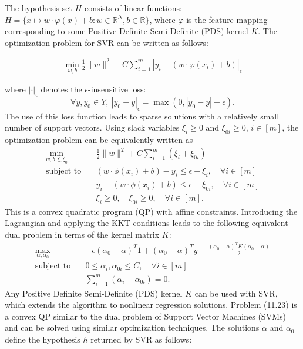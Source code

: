 \documentclass[fleqn,10pt]{olplainarticle}
\begin{document}
The hypothesis set $H$ consists of linear functions: $H = \{x \mapsto w \cdot \varphi(x) + b: w \in \mathbb{R}^N, b \in \mathbb{R}\}$, where $\varphi$ is the feature mapping corresponding to some Positive Definite Semi-Definite (PDS) kernel $K$. The optimization problem for SVR can be written as follows:

\begin{align}
\min_{w, b} \frac{1}{2}\|w\|^2 + C \sum_{i=1}^m \left|y_i - \left(w \cdot \varphi(x_i) + b\right)\right|_\epsilon \label{eq:svr}
\end{align}

where $|\cdot|_\epsilon$ denotes the $\epsilon$-insensitive loss:
\[
\forall y,y_0 \in Y, \ |y_0 - y|_\epsilon = \max(0, |y_0 - y| - \epsilon).
\]
The use of this loss function leads to sparse solutions with a relatively small number of support vectors. Using slack variables $\xi_i \geq 0$ and $\xi_{0i} \geq 0$, $i \in [m]$, the optimization problem can be equivalently written as
\[
\begin{aligned}
    \min_{w,b,\xi,\xi_0} \quad & \frac{1}{2} \|w\|^2 + C \sum_{i=1}^{m} (\xi_i + \xi_{0i}) \\
    \text{subject to} \quad & (w \cdot \phi(x_i) + b) - y_i \leq \epsilon + \xi_i, \quad \forall i \in [m] \\
    & y_i - (w \cdot \phi(x_i) + b) \leq \epsilon + \xi_{0i}, \quad \forall i \in [m] \\
    & \xi_i \geq 0, \quad \xi_{0i} \geq 0, \quad \forall i \in [m].
\end{aligned}
\]
This is a convex quadratic program (QP) with affine constraints. Introducing the Lagrangian and applying the KKT conditions leads to the following equivalent dual problem in terms of the kernel matrix $K$:
\[
\begin{aligned}
    \max_{\alpha,\alpha_0} \quad & -\epsilon (\alpha_0 - \alpha)^T1 +(\alpha_0 - \alpha)^Ty - \frac{(\alpha_0 - \alpha)^TK(\alpha_0 - \alpha)}{2} \\
    \text{subject to} \quad & 0 \leq \alpha_i, \alpha_{0i} \leq C, \quad \forall i \in [m] \\
    & \sum_{i=1}^{m} (\alpha_i - \alpha_{0i}) = 0.
\end{aligned}
\]
Any Positive Definite Semi-Definite (PDS) kernel $K$ can be used with SVR, which extends the algorithm to nonlinear regression solutions. Problem (11.23) is a convex QP similar to the dual problem of Support Vector Machines (SVMs) and can be solved using similar optimization techniques. The solutions $\alpha$ and $\alpha_0$ define the hypothesis $h$ returned by SVR as follows:
\end{document}

